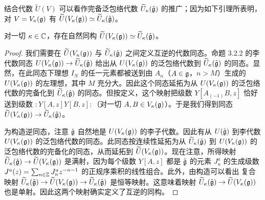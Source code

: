 
结合代数 $\widetilde U(V)$ 可以看作完备泛包络代数 $\widetilde U_\kappa(\hat{\mathfrak{g}})$ 的推广；因为如下引理所表明，对 $V=V_\kappa(\mathfrak{g})$ 有 $\widetilde U(V_\kappa(\mathfrak{g}))\simeq\widetilde U_\kappa(\hat{\mathfrak{g}})$。

\begin{lemma}
    对一切 $\kappa\in\mathbb{C}$，存在自然同构 $\widetilde U(V_\kappa(\mathfrak{g}))\simeq\widetilde U_\kappa(\hat{\mathfrak{g}})$。
\end{lemma}

\begin{proof}
    我们需要在 $\widetilde U(V_\kappa(\mathfrak{g}))$ 与 $\widetilde U_\kappa(\hat{\mathfrak{g}})$ 之间定义互逆的代数同态。命题 3.2.2 的李代数同态 $U(V_\kappa(\mathfrak{g}))\to\widetilde U_\kappa(\hat{\mathfrak{g}})$ 给出从 $U(V_\kappa(\mathfrak{g}))$ 的泛包络代数到 $\widetilde U_\kappa(\hat{\mathfrak{g}})$ 的同态。显然，在此同态下理想 $I_N$ 的任一元素都被送到由 $A_n$（$A\in\mathfrak{g}$，$n>M$）生成的 $U(V_\kappa(\mathfrak{g}))$ 的左理想，其中 $M$ 充分大。因此这个同态延拓为从 $U(V_\kappa(\mathfrak{g}))$ 的泛包络代数的完备化到 $\widetilde U_\kappa(\hat{\mathfrak{g}})$ 的同态。但按定义，这个映射把级数 $Y[A_{(-1)}B,z]$ 恰好送到级数 $:Y[A,z]Y[B,z]:$（对一切 $A,B\in V_\kappa(\mathfrak{g})$）。于是我们得到同态 $\widetilde U(V_\kappa(\mathfrak{g}))\to\widetilde U_\kappa(\hat{\mathfrak{g}})$。

    为构造逆同态，注意 $\hat{\mathfrak{g}}$ 自然地是 $U(V_\kappa(\mathfrak{g}))$ 的李子代数。因此有从 $U(\hat{\mathfrak{g}})$ 到李代数 $U(V_\kappa(\mathfrak{g}))$ 的泛包络代数的同态。此同态按连续性延拓为从 $\widetilde U_\kappa(\hat{\mathfrak{g}})$ 到 $U(V_\kappa(\mathfrak{g}))$ 的泛包络代数的完备化的同态，从而延拓到 $\widetilde U(V_\kappa(\mathfrak{g}))$。现在注意，所得映射 $\widetilde U_\kappa(\hat{\mathfrak{g}})\to\widetilde U(V_\kappa(\mathfrak{g}))$ 是满射，因为每个级数 $Y[A,z]$ 都是 $\hat{\mathfrak{g}}$ 的元素 $J^a_n$ 的生成级数 $J^a(z)=\sum_{n\in\mathbb{Z}}J^a_n z^{-n-1}$ 的正规序乘积的线性组合。此外，由构造可以看出
    复合映射 $\widetilde U_\kappa(\hat{\mathfrak{g}})\to\widetilde U(V_\kappa(\mathfrak{g}))\to\widetilde U_\kappa(\hat{\mathfrak{g}})$ 是恒等映射。这意味着映射 $\widetilde U_\kappa(\hat{\mathfrak{g}})\to\widetilde U(V_\kappa(\mathfrak{g}))$ 也是单射。因此这两个映射确实定义了互逆的同构。
\end{proof}

